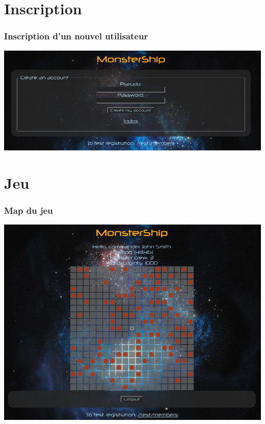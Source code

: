 \documentclass{beamer}
\begin{document}
	\section{Inscription}
		\begin{frame}
		\frametitle{Inscription d'un nouvel utilisateur}
			\includegraphics[width=1\textwidth]{images/inscription.png} 
		\end{frame}
		
	\section{Jeu}
		\begin{frame}
		\frametitle{Map du jeu}
			\includegraphics[width=1\textwidth]{images/home.png} 
		\end{frame}
		
\end{document}
